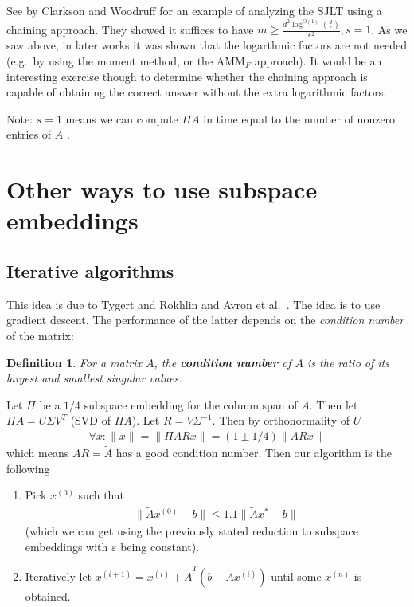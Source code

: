 \documentclass[11pt]{article}
\newcommand{\eps}{\varepsilon}
\newtheorem{definition}[theorem]{Definition}
\begin{document}
See \cite{clarkson2013low}
by Clarkson and Woodruff for an example of analyzing the SJLT using a chaining approach. They showed it suffices to have $m \geq \frac{d^2 \log^{O(1)}(\frac{d}{\epsilon})}{\epsilon^2}, s = 1$. As we saw above, in later works it was shown that the logarthmic factors are not needed (e.g.\ by using the moment method, or the AMM$_F$ approach). It would be an interesting exercise though to determine whether the \cite{clarkson2013low} chaining approach is capable of obtaining the correct answer without the extra logarithmic factors.

Note: $s = 1$ means we can compute $\Pi A$ in time equal to the number of nonzero entries of $A$ .  

\section{Other ways to use subspace embeddings}

\subsection{Iterative algorithms}

This idea is due to Tygert and Rokhlin \cite{rokhlin2008fast} and Avron et al.\ \cite{avron2010blendenpik}. The idea is to use gradient descent. The performance of the latter depends on the \emph{condition number} of the matrix:

\begin{definition}
For a matrix $A$, the \textbf{condition number} of $A$ is the ratio of its largest and smallest singular values.
\end{definition}

Let $\Pi$ be a $1/4$ subspace embedding for the column span of $A$. Then let $\Pi A = U\Sigma V^T$ (SVD of $\Pi A$). Let $R=V\Sigma^{-1}$. Then by orthonormality of $U$
\begin{align*}
	\forall x: \|x\| = \|\Pi ARx\|=(1\pm1/4)\|ARx\|
\end{align*}
which means $AR=\tilde{A}$ has a good condition number. Then our algorithm is the following

\begin{enumerate}
	\item Pick $x^{(0)}$ such that 
	\begin{align*}
	\|\tilde{A}x^{(0)}-b\|\leq 1.1\|\tilde{A}x^*-b\|
\end{align*}
(which we can get using the previously stated reduction to subspace embeddings with $\eps$ being constant).
\item Iteratively let $x^{(i+1)} = x^{(i)} + \tilde{A}^T(b-\tilde{A}x^{(i)})$ until some $x^{(n)}$ is obtained.
\end{enumerate}
\end{document}

